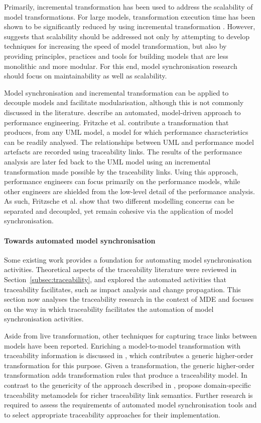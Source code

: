 Primarily, incremental transformation has been used to address the scalability of model transformations. For large models, transformation execution time has been shown to be significantly reduced by using incremental transformation \cite{hearnden06incremental}. However, \cite{kolovos08scalability} suggests that scalability should be addressed not only by attempting to develop techniques for increasing the speed of model transformation, but also by providing principles, practices and tools for building models that are less monolithic and more modular. For this end, model synchronisation research should focus on maintainability as well as scalability.

Model synchronisation and incremental transformation can be applied to decouple models and facilitate modularisation, although this is not commonly discussed in the literature. \cite{fritzsche08tracing} describe an automated, model-driven approach to performance engineering. Fritzche et al. contribute a transformation that produces, from any UML model, a model for which performance characteristics can be readily analysed. The relationships between UML and performance model artefacts are recorded using traceability links. The results of the performance analysis are later fed back to the UML model using an incremental transformation made possible by the traceability links. Using this approach, performance engineers can focus primarily on the performance models, while other engineers are shielded from the low-level detail of the performance analysis. As such, Fritzsche et al. show that two different modelling concerns can be separated and decoupled, yet remain cohesive via the application of model synchronisation.

\paragraph{Towards automated model synchronisation}
Some existing work provides a foundation for automating model synchronisation activities. Theoretical aspects of the traceability literature were reviewed in Section~\ref{subsec:traceability}, and explored the automated activities that traceability facilitates, such as impact analysis and change propagation.  This section now analyses the traceability research in the context of MDE and focuses on the way in which traceability facilitates the automation of model synchronisation activities.

Aside from live transformation, other techniques for capturing trace links between models have been reported. Enriching a model-to-model transformation with traceability information is discussed in \cite{jouault05loosely}, which contributes a generic higher-order transformation for this purpose. Given a transformation, the generic higher-order transformation adds transformation rules that produce a traceability model. In contrast to the genericity of the approach described in \cite{jouault05loosely}, \cite{drivalos08rigorously} propose domain-specific traceability metamodels for richer traceability link semantics. Further research is required to assess the requirements of automated model synchronisation tools and to select appropriate traceability approaches for their implementation.

